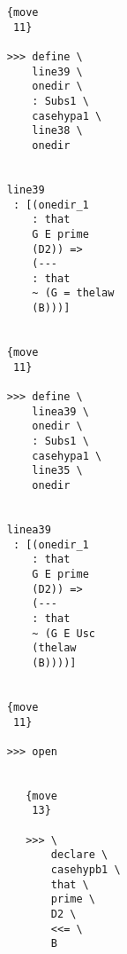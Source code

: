 \documentclass[12pt]{article}
\begin{document}
\begin{verbatim}
                                    {move 
                                     11}

                                    >>> define \
                                        line39 \
                                        onedir \
                                        : Subs1 \
                                        casehypa1 \
                                        line38 \
                                        onedir


                                    line39 
                                     : [(onedir_1 
                                        : that 
                                        G E prime 
                                        (D2)) => 
                                        (--- 
                                        : that 
                                        ~ (G = thelaw 
                                        (B)))]


                                    {move 
                                     11}

                                    >>> define \
                                        linea39 \
                                        onedir \
                                        : Subs1 \
                                        casehypa1 \
                                        line35 \
                                        onedir


                                    linea39 
                                     : [(onedir_1 
                                        : that 
                                        G E prime 
                                        (D2)) => 
                                        (--- 
                                        : that 
                                        ~ (G E Usc 
                                        (thelaw 
                                        (B))))]


                                    {move 
                                     11}

                                    >>> open


                                       {move 
                                        13}

                                       >>> \
                                           declare \
                                           casehypb1 \
                                           that \
                                           prime \
                                           D2 \
                                           <<= \
                                           B



\end{verbatim}
\end{document}

